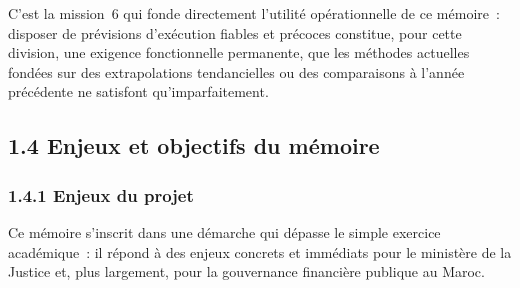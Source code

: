 C'est la mission~6 qui fonde directement l'utilit\'e op\'erationnelle de ce m\'emoire~: disposer de pr\'evisions d'ex\'ecution fiables et pr\'ecoces constitue, pour cette division, une exigence fonctionnelle permanente, que les m\'ethodes actuelles fond\'ees sur des extrapolations tendancielles ou des comparaisons \`a l'ann\'ee pr\'ec\'edente ne satisfont qu'imparfaitement.

\subsection*{1.4 \quad Enjeux et objectifs du m\'emoire}

\subsubsection*{1.4.1 \quad Enjeux du projet}

Ce m\'emoire s'inscrit dans une d\'emarche qui d\'epasse le simple exercice acad\'emique~: il r\'epond \`a des enjeux concrets et imm\'ediats pour le minist\`ere de la Justice et, plus largement, pour la gouvernance financi\`ere publique au Maroc.

